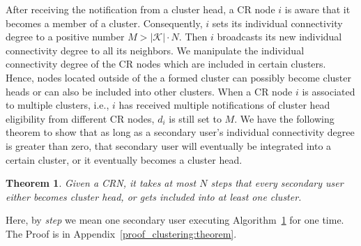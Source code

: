 \documentclass[10pt,journal,compsoc]{IEEEtran}
\makeatletter
\theoremstyle{mytheoremstyle}
\newtheorem{theorem}{Theorem}[section]
\theoremstyle{mytheoremstyle}
\theoremstyle{mytheoremstyle}
\renewenvironment{proof}[1][\proofname]{%
      \par\pushQED{\qed}\fontfamily{ptm}\selectfont%
      \topsep6\p@\@plus6\p@\relax
      \trivlist\item[\hskip\labelsep\bfseries#1\@addpunct{.}]%
      \ignorespaces
    }{%
      \popQED\endtrivlist\@endpefalse
    }
\newcommand{\ie}{i.e., }
\makeatother
\begin{document}
After receiving the notification from a cluster head, a CR node $i$ is aware that it becomes a member of a cluster. Consequently, $i$ sets its individual connectivity degree to a positive number $M > |\mathcal{K}| \cdot N$. %
Then $i$ broadcasts its new individual connectivity degree to all its neighbors. 
We manipulate the individual connectivity degree of the CR nodes which are included in certain clusters. Hence, nodes located outside of the a formed cluster can possibly become cluster heads or can also be included into other clusters.
When a CR node $i$ is associated to multiple clusters, \ie $i$ has received multiple notifications of cluster head eligibility from different CR nodes, $d_i$ is still set to $M$.
We have the following theorem to show that as long as a secondary user's individual connectivity degree is greater than zero, that secondary user will eventually be integrated into a certain cluster, or it eventually becomes a cluster head.
\begin{theorem}
\label{clustering:theorem}
Given a CRN, it takes at most $N$ steps that every secondary user either becomes cluster head, or gets included into at least one cluster.
\end{theorem}
Here, by \textit{step} we mean one secondary user executing Algorithm~\ref{clustering:theorem} for one time.
The Proof is in Appendix~\ref{proof_clustering:theorem}.
\end{document}
